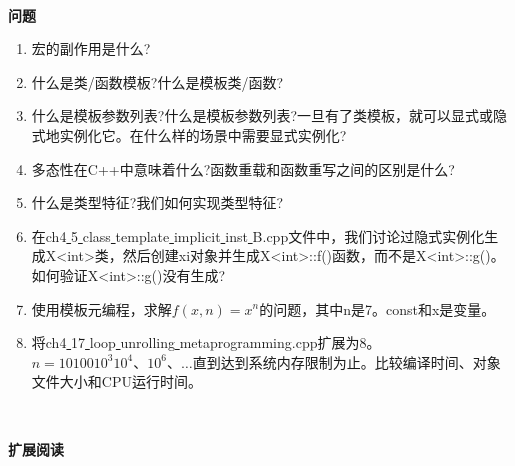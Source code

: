 \noindent\textbf{}\ \par
\textbf{问题} \ \par
\begin{enumerate}
	\item 宏的副作用是什么?
	\item 什么是类/函数模板?什么是模板类/函数?
	\item 什么是模板参数列表?什么是模板参数列表?一旦有了类模板，就可以显式或隐式地实例化它。在什么样的场景中需要显式实例化?
	\item 多态性在C++中意味着什么?函数重载和函数重写之间的区别是什么?
	\item 什么是类型特征?我们如何实现类型特征?
	\item 在ch4\underline{ }5\underline{ }class\underline{ }template\underline{ }implicit\underline{ }inst\underline{ }B.cpp文件中，我们讨论过隐式实例化生成X<int>类，然后创建xi对象并生成X<int>::f()函数，而不是X<int>::g()。如何验证X<int>::g()没有生成?
	\item 使用模板元编程，求解$f(x,n) = x^n$的问题，其中n是7。const和x是变量。
	\item 将ch4\underline{ }17\underline{ }loop\underline{ }unrolling\underline{ }metaprogramming.cpp扩展为8。$n = 10100 10 ^ 3 10 ^ 4、10 ^ 6、…$直到达到系统内存限制为止。比较编译时间、对象文件大小和CPU运行时间。
\end{enumerate}

\noindent\textbf{}\ \par
\textbf{扩展阅读} \ \par

